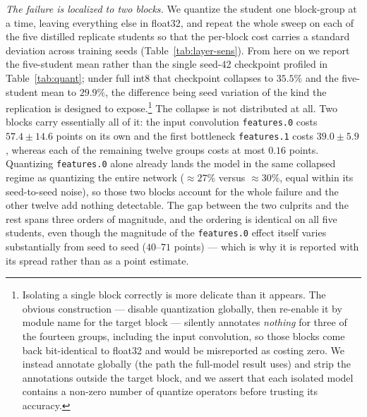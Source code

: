\documentclass[conference]{IEEEtran}
\begin{document}
\emph{The failure is localized to two blocks.} We quantize the student one
block-group at a time, leaving everything else in float32, and repeat the whole
sweep on each of the five distilled replicate students so that the per-block cost
carries a standard deviation across training seeds (Table~\ref{tab:layer-sens}).
From here on we report the five-student mean rather than the single seed-42
checkpoint profiled in Table~\ref{tab:quant}; under full int8 that checkpoint
collapses to $35.5\%$ and the five-student mean to $29.9\%$, the difference being
seed variation of the kind the replication is designed to expose.\footnote{Isolating a single block correctly is more
delicate than it appears. The obvious construction --- disable quantization
globally, then re-enable it by module name for the target block --- silently
annotates \emph{nothing} for three of the fourteen groups, including the input
convolution, so those blocks come back bit-identical to float32 and would be
misreported as costing zero. We instead annotate globally (the path the
full-model result uses) and strip the annotations outside the target block, and
we assert that each isolated model contains a non-zero number of quantize
operators before trusting its accuracy.} The collapse is not distributed at all.
Two blocks carry essentially all of it: the input convolution
\texttt{features.0} costs $57.4\pm14.6$ points on its own and the first
bottleneck \texttt{features.1} costs $39.0\pm5.9$, whereas each of the remaining
twelve groups costs at most $0.16$ points. Quantizing \texttt{features.0} alone
already lands the model in the same collapsed regime as quantizing the entire
network ($\approx27\%$ versus $\approx30\%$, equal within its seed-to-seed noise),
so those two blocks account for the whole failure and the other twelve add nothing
detectable. The gap between the two culprits and the rest spans three orders of
magnitude, and the ordering is identical on all five students, even though the
magnitude of the \texttt{features.0} effect itself varies substantially from seed
to seed ($40$--$71$ points) --- which is why it is reported with its spread rather
than as a point estimate.
\end{document}
